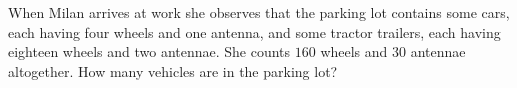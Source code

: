 When Milan arrives at work she observes that the parking lot contains some cars, each having four wheels and one antenna, and some tractor trailers, each having eighteen wheels and two antennae. She counts $160$ wheels and $30$ antennae altogether. How many vehicles are in the parking lot?
